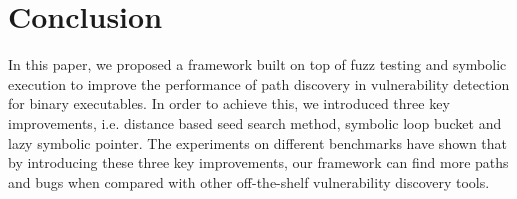 \documentclass[a4paper]{article}
\begin{document}
\section{Conclusion}
In this paper, we proposed a framework built on top of fuzz testing and symbolic execution to improve the performance of path discovery in vulnerability detection for binary executables. In order to achieve this, we introduced three key improvements, i.e. distance based seed search method, symbolic loop bucket and lazy symbolic pointer. The experiments on different benchmarks have shown that by introducing these three key improvements, our framework can find more paths and bugs when compared with other off-the-shelf vulnerability discovery tools. 



\end{document}
